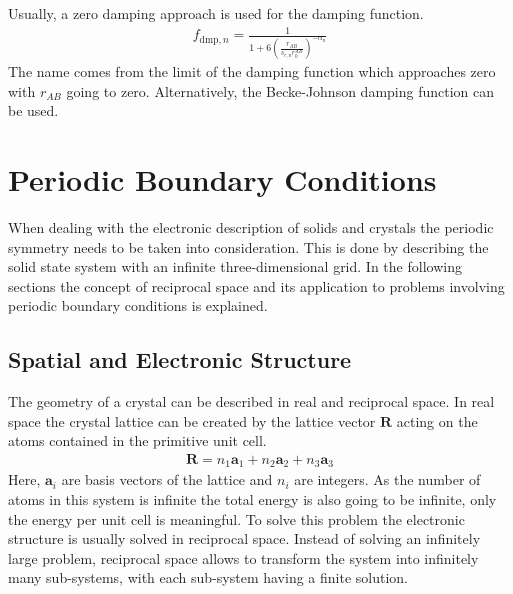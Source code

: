 Usually, a zero damping approach is used for the damping function.
%
\begin{align}
	f_{\text{dmp},n} = \frac{1}{1+6\left( \frac{r_{AB}}{s_{r,n}r_0^{AB}} \right)^{-\alpha_n}}
\end{align}
%
The name comes from the limit of the damping function which approaches zero
with $r_{AB}$ going to zero. Alternatively, the Becke-Johnson damping
function\autocite{Grimme_Effectdampingfunction_2011} can be used. 

\section{Periodic Boundary Conditions}
\label{sec:PBC}

When dealing with the electronic description of solids and crystals the
periodic symmetry needs to be taken into consideration. This is done by
describing the solid state system with an infinite three-dimensional grid. In
the following sections the concept of reciprocal space and its application to
problems involving periodic boundary conditions is explained.

\subsection{Spatial and Electronic Structure}
\label{sec:SpatialandElectronicStructure}

The geometry of a crystal can be described in real and reciprocal space. In real
space the crystal lattice can be created by the lattice vector
$\mathbf{R}$ acting on the atoms contained in the primitive unit cell.
%
\begin{align}
    \mathbf{R}=n_1\mathbf{a}_1+n_2\mathbf{a}_2+n_3\mathbf{a}_3    
\end{align}
%
Here, $\mathbf{a}_i$ are basis vectors of the lattice and $n_i$ are integers.
As the number of atoms in this system is infinite the total energy is also
going to be infinite, only the energy per unit cell is meaningful. To solve
this problem the electronic structure is usually solved in reciprocal space.
Instead of solving an infinitely large problem, reciprocal space allows to
transform the system into infinitely many sub-systems, with each sub-system
having a finite solution. 

